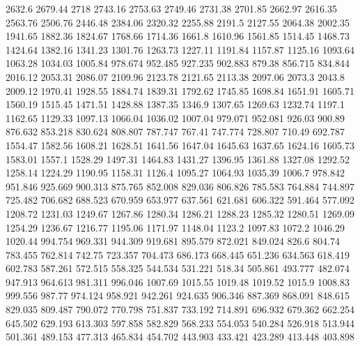 2632.6      2679.44      2718      2743.16      2753.63      2749.46      2731.38      2701.85      2662.97      2616.35      2563.76      2506.76      2446.48      2384.06      2320.32      2255.88      2191.5      2127.55      2064.38      2002.35      1941.65      1882.36      1824.67      1768.66      1714.36      1661.8      1610.96      1561.85      1514.45      1468.73      1424.64      1382.16      1341.23      1301.76      1263.73      1227.11      1191.84      1157.87      1125.16      1093.64      1063.28      1034.03      1005.84      978.674      952.485      927.235      902.883      879.38      856.715      834.844      
2016.12      2053.31      2086.07      2109.96      2123.78      2121.65      2113.38      2097.06      2073.3      2043.8      2009.12      1970.41      1928.55      1884.74      1839.31      1792.62      1745.85      1698.84      1651.91      1605.71      1560.19      1515.45      1471.51      1428.88      1387.35      1346.9      1307.65      1269.63      1232.74      1197.1      1162.65      1129.33      1097.13      1066.04      1036.02      1007.04      979.071      952.081      926.03      900.89      876.632      853.218      830.624      808.807      787.747      767.41      747.774      728.807      710.49      692.787      
1554.47      1582.56      1608.21      1628.51      1641.56      1647.04      1645.63      1637.65      1624.16      1605.73      1583.01      1557.1      1528.29      1497.31      1464.83      1431.27      1396.95      1361.88      1327.08      1292.52      1258.14      1224.29      1190.95      1158.31      1126.4      1095.27      1064.93      1035.39      1006.7      978.842      951.846      925.669      900.313      875.765      852.008      829.036      806.826      785.583      764.884      744.897      725.482      706.682      688.523      670.959      653.977      637.561      621.681      606.322      591.464      577.092      
1208.72      1231.03      1249.67      1267.86      1280.34      1286.21      1288.23      1285.32      1280.51      1269.09      1254.29      1236.67      1216.77      1195.06      1171.97      1148.04      1123.2      1097.83      1072.2      1046.29      1020.44      994.754      969.331      944.309      919.681      895.579      872.021      849.024      826.6      804.74      783.455      762.814      742.75      723.357      704.473      686.173      668.445      651.236      634.563      618.419      602.783      587.261      572.515      558.325      544.534      531.221      518.34      505.861      493.777      482.074      
947.913      964.613      981.311      996.046      1007.69      1015.55      1019.48      1019.52      1015.9      1008.83      999.556      987.77      974.124      958.921      942.261      924.635      906.346      887.369      868.091      848.615      829.035      809.487      790.072      770.798      751.837      733.192      714.891      696.932      679.362      662.254      645.502      629.193      613.303      597.858      582.829      568.233      554.053      540.284      526.918      513.944      501.361      489.153      477.313      465.834      454.702      443.903      433.421      423.289      413.448      403.898      
